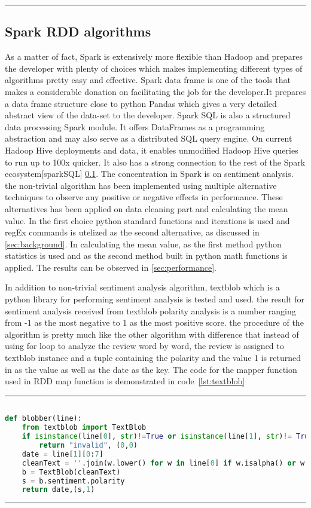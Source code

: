 \rule{200 pt}{0.5 pt}


\subsection{Spark RDD algorithms}
As a matter of fact, Spark is extensively more flexible than Hadoop and prepares the developer with plenty of choices which makes implementing different types of algorithms pretty easy and effective. Spark data frame is one of the tools that makes a considerable donation on facilitating the job for the developer.It prepares a data frame structure close to python Pandas which gives a very detailed abstract view of the data-set to the developer. Spark SQL is also a structured data processing Spark module. It offers DataFrames as a programming abstraction and may also serve as a distributed SQL query engine. On current Hadoop Hive deployments and data, it enables unmodified Hadoop Hive queries to run up to 100x quicker. It also has a strong connection to the rest of the Spark ecosystem[sparkSQL] \ref{}. 
The concentration in Spark is on sentiment analysis. the non-trivial algorithm has been implemented using multiple alternative techniques to observe any positive or negative effects in performance. These alternatives has been applied on data cleaning part and calculating the mean value. In the first choice python standard functions and iterations is used and regEx commands is utelized as the second alternative, as discussed in \ref{sec:background}. In calculating the mean value, as the first method python statistics is used and as the second method built in python math functions is applied.  The results can be observed in \ref{sec:performance}. 

In addition to non-trivial sentiment analysis algorithm, textblob which is a python library for performing sentiment analysis is tested and used. the result for sentiment analysis received from textblob polarity analysis is a number ranging from -1 as the most negative to 1 as the most positive score. the procedure of the algorithm is pretty much like the other algorithm with difference that instead of using for loop to analyze the review word by word, the review is assigned to textblob instance and a tuple containing the polarity and the value 1 is returned in as the value as well as the date as the key. The code for the mapper function used in RDD map function is demonstrated in code~\ref{lst:textblob} 

\rule{200 pt}{0.5 pt} 

\renewcommand{\lstlistingname}{Code}
\lstset{style=mystyle}
\begin{lstlisting}[language=Python, caption={Sentiment analysis textblob algorithm spark RDD mapper function }, label={lst:textblob}, mathescape = true, breaklines=true]

def blobber(line): 
    from textblob import TextBlob 
    if isinstance(line[0], str)!=True or isinstance(line[1], str)!= True: 
        return "invalid", (0,0)
    date = line[1][0:7]
    cleanText = ''.join(w.lower() for w in line[0] if w.isalpha() or w == " ")
    b = TextBlob(cleanText) 
    s = b.sentiment.polarity 
    return date,(s,1) 


\end{lstlisting}

\rule{200 pt}{0.5 pt}
